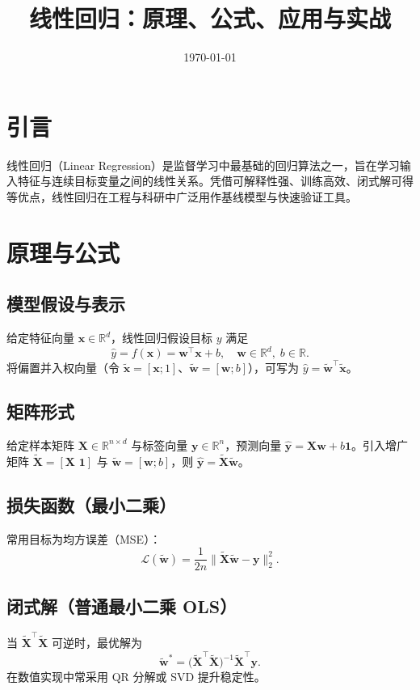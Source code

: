 \documentclass[UTF8,zihao=-4]{ctexart}
\title{线性回归：原理、公式、应用与实战}
\author{}
\date{\today}
\begin{document}
\maketitle
\tableofcontents

\section{引言}
线性回归（Linear Regression）是监督学习中最基础的回归算法之一，旨在学习输入特征与连续目标变量之间的线性关系。凭借可解释性强、训练高效、闭式解可得等优点，线性回归在工程与科研中广泛用作基线模型与快速验证工具。

\section{原理与公式}
\subsection{模型假设与表示}
给定特征向量 \(\mathbf{x} \in \mathbb{R}^d\)，线性回归假设目标 \(y\) 满足
\begin{equation}
    \hat{y} = f(\mathbf{x}) = \mathbf{w}^\top \mathbf{x} + b,\quad \mathbf{w} \in \mathbb{R}^d,\; b \in \mathbb{R}.
\end{equation}
将偏置并入权向量（令 \(\tilde{\mathbf{x}}=[\mathbf{x};1]\)、\(\tilde{\mathbf{w}}=[\mathbf{w};b]\)），可写为 \(\hat{y}=\tilde{\mathbf{w}}^\top \tilde{\mathbf{x}}\)。

\subsection{矩阵形式}
给定样本矩阵 \(\mathbf{X}\in\mathbb{R}^{n\times d}\) 与标签向量 \(\mathbf{y}\in\mathbb{R}^{n}\)，预测向量 \(\hat{\mathbf{y}}=\mathbf{X}\mathbf{w}+b\mathbf{1}\)。引入增广矩阵 \(\tilde{\mathbf{X}}=[\mathbf{X}\,\,\mathbf{1}]\) 与 \(\tilde{\mathbf{w}}=[\mathbf{w};b]\)，则 \(\hat{\mathbf{y}}=\tilde{\mathbf{X}}\tilde{\mathbf{w}}\)。

\subsection{损失函数（最小二乘）}
常用目标为均方误差（MSE）：
\begin{equation}
    \mathcal{L}(\tilde{\mathbf{w}}) = \frac{1}{2n} \lVert \tilde{\mathbf{X}}\tilde{\mathbf{w}} - \mathbf{y} \rVert_2^2.
\end{equation}

\subsection{闭式解（普通最小二乘 OLS）}
当 \(\tilde{\mathbf{X}}^\top\tilde{\mathbf{X}}\) 可逆时，最优解为
\begin{equation}
    \tilde{\mathbf{w}}^* = \big(\tilde{\mathbf{X}}^\top\tilde{\mathbf{X}}\big)^{-1}\tilde{\mathbf{X}}^\top\mathbf{y}.
\end{equation}
在数值实现中常采用 QR 分解或 SVD 提升稳定性。
\end{document}
